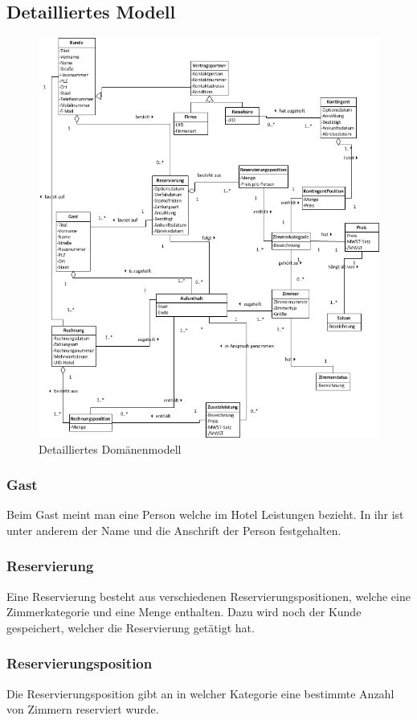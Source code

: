 \documentclass[10pt,a4paper,titlepage]{article}
\begin{document}
\subsection{Detailliertes Modell}
\begin{figure}[h]
	\includegraphics[width=\linewidth]{Images/Domaenenmodell.png}
	\caption{Detailliertes Domänenmodell}
\end{figure}
\subsubsection{\Gls{Gast}}
Beim \Gls{Gast} meint man eine Person welche im Hotel Leistungen bezieht. In ihr ist unter anderem der Name und die Anschrift der Person festgehalten.
\subsubsection{\Gls{Reservierung}}
Eine \Gls{Reservierung} besteht aus verschiedenen Reservierungspositionen, welche eine Zimmerkategorie und eine Menge enthalten. Dazu wird noch der \Gls{Kunde} gespeichert, welcher die \Gls{Reservierung} getätigt hat.
\subsubsection{Reservierungsposition}
Die Reservierungsposition gibt an in welcher Kategorie eine bestimmte Anzahl von
\Gls{Zimmer}n reserviert wurde.
\end{document}
